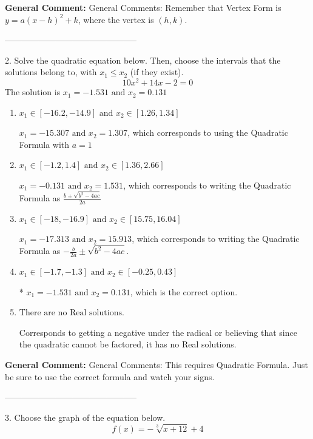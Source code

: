 \documentclass{extbook}[14pt]
\begin{document}
\textbf{General Comment:} General Comments: Remember that Vertex Form is $y = a(x-h)^2+k$, where the vertex is $(h, k)$. 

-----------------------------------------------

2. Solve the quadratic equation below. Then, choose the intervals that the solutions belong to, with $x_1 \leq x_2$ (if they exist).
\[ 10x^{2} +14 x -2 = 0 \] 
The solution is $ x_1 = -1.531 \text{ and } x_2 = 0.131 $ 

\begin{enumerate}[label=\Alph*.] 
\item $ x_1 \in [-16.2, -14.9] \text{ and } x_2 \in [1.26, 1.34] $ 

  $x_1 = -15.307 \text{ and } x_2 = 1.307$, which corresponds to using the Quadratic Formula with $a=1$ 
\item $ x_1 \in [-1.2, 1.4] \text{ and } x_2 \in [1.36, 2.66] $ 

  $x_1 = -0.131 \text{ and } x_2 = 1.531$, which corresponds to writing the Quadratic Formula as $\frac{b \pm \sqrt{b^2 - 4ac}}{2a}$ 
\item $ x_1 \in [-18, -16.9] \text{ and } x_2 \in [15.75, 16.04] $ 

  $x_1 = -17.313 \text{ and } x_2 = 15.913$, which corresponds to writing the Quadratic Formula as $-\frac{b}{2a} \pm \sqrt{b^2 - 4ac}$. 
\item $ x_1 \in [-1.7, -1.3] \text{ and } x_2 \in [-0.25, 0.43] $ 

 * $x_1 = -1.531 \text{ and } x_2 = 0.131$, which is the correct option. 
\item $ \text{There are no Real solutions.} $ 

 Corresponds to getting a negative under the radical or believing that since the quadratic cannot be factored, it has no Real solutions. 
\end{enumerate} 
 
\textbf{General Comment:} General Comments: This requires Quadratic Formula. Just be sure to use the correct formula and watch your signs. 

-----------------------------------------------

3. Choose the graph of the equation below.
\[ f(x) = - \sqrt[3]{x + 12} + 4 \] 
\end{document}
